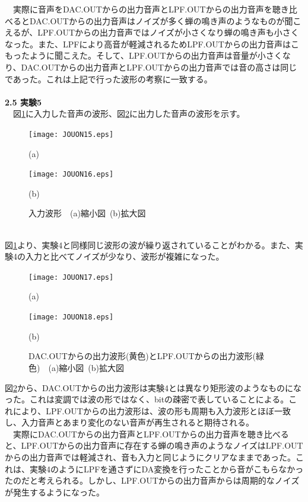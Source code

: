 \documentclass[a4paper,10.5pt]{ltjsarticle}
\begin{document}
　実際に音声をDAC.OUTからの出力音声とLPF.OUTからの出力音声を聴き比べるとDAC.OUTからの出力音声はノイズが多く蝉の鳴き声のようなものが聞こえるが、LPF.OUTからの出力音声ではノイズが小さくなり蝉の鳴き声も小さくなった。また、LPFにより高音が軽減されるためLPF.OUTからの出力音声はこもったように聞こえた。そして、LPF.OUTからの出力音声は音量が小さくなり、DAC.OUTからの出力音声とLPF.OUTからの出力音声では音の高さは同じであった。これは上記で行った波形の考察に一致する。\\
\\
{\large \bfseries 2.5 実験5}\\
　図\ref{voice2}に入力した音声の波形、図\ref{voice3}に出力した音声の波形を示す。
\begin{figure}[h]
  \hspace{27pt}\begin{minipage}[h]{0.45\linewidth}
    \texttt{[image: JOUON15.eps]}
    \caption*{(a)}
  \end{minipage}
  \begin{minipage}[h]{0.43\linewidth}
    \texttt{[image: JOUON16.eps]}
    \caption*{(b)}
  \end{minipage}
  \caption{入力波形\ \ (a)縮小図\ (b)拡大図}
  \label{voice2}
\end{figure}\\
図\ref{voice2}より、実験4と同様同じ波形の波が繰り返されていることがわかる。また、実験4の入力と比べてノイズが少なり、波形が複雑になった。
\clearpage
\begin{figure}[h]
  \hspace{27pt}\begin{minipage}[h]{0.45\linewidth}
    \texttt{[image: JOUON17.eps]}
    \caption*{(a)}
  \end{minipage}
  \begin{minipage}[h]{0.43\linewidth}
    \texttt{[image: JOUON18.eps]}
    \caption*{(b)}
  \end{minipage}
  \caption{DAC.OUTからの出力波形(黄色)とLPF.OUTからの出力波形(緑色)\ \ (a)縮小図\ (b)拡大図}
  \label{voice3}
\end{figure}
図\ref{voice3}から、DAC.OUTからの出力波形は実験4とは異なり矩形波のようなものになった。これは\Delta\Sigma 変調では波の形ではなく、bitの疎密で表していることによる。これにより、LPF.OUTからの出力波形は、波の形も周期も入力波形とほぼ一致し、入力音声とあまり変化のない音声が再生されると期待される。\\
　実際にDAC.OUTからの出力音声とLPF.OUTからの出力音声を聴き比べると、LPF.OUTからの出力音声に存在する蝉の鳴き声のようなノイズはLPF.OUTからの出力音声では軽減され、音も入力と同じようにクリアなままであった。これは、実験4のようにLPFを通さずにDA変換を行ったことから音がこもらなかったのだと考えられる。しかし、LPF.OUTからの出力音声からは周期的なノイズが発生するようになった。
\end{document}
